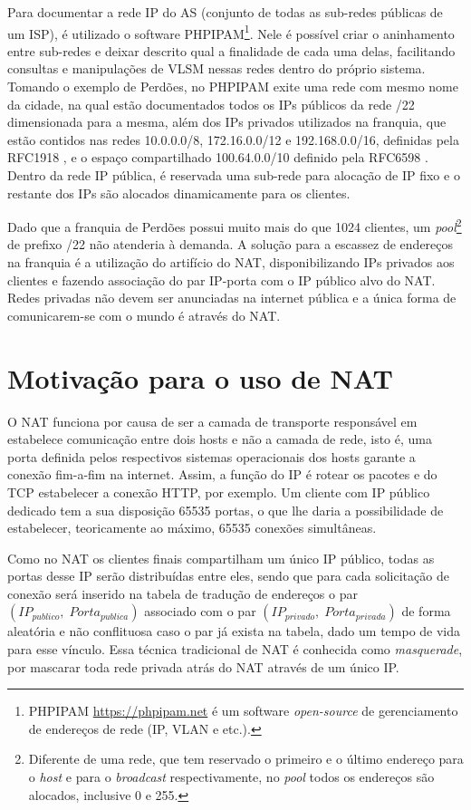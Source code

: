    Para documentar a rede IP do AS (conjunto de todas as sub-redes públicas de um ISP), é utilizado o software PHPIPAM\footnote{PHPIPAM \url{https://phpipam.net} é um software \textit{open-source} de gerenciamento de endereços de rede (IP, VLAN e etc.).}. Nele é possível criar o aninhamento entre sub-redes e deixar descrito qual a finalidade de cada uma delas, facilitando consultas e manipulações de VLSM nessas redes dentro do próprio sistema. Tomando o exemplo de Perdões, no PHPIPAM exite uma rede com mesmo nome da cidade, na qual estão documentados todos os IPs públicos da rede /22 dimensionada para a mesma, além dos IPs privados utilizados na franquia, que estão contidos nas redes 10.0.0.0/8, 172.16.0.0/12 e 192.168.0.0/16, definidas pela RFC1918 \cite{rfc1918}, e o espaço compartilhado 100.64.0.0/10 definido pela RFC6598 \cite{rfc6598}. Dentro da rede IP pública, é reservada uma sub-rede para alocação de IP fixo e o restante dos IPs são alocados dinamicamente para os clientes.
   
   Dado que a franquia de Perdões possui muito mais do que 1024 clientes, um \textit{pool}\footnote{Diferente de uma rede, que tem reservado o primeiro e o último endereço para o \textit{host} e para o \textit{broadcast} respectivamente, no \textit{pool} todos os endereços são alocados, inclusive 0 e 255.} de prefixo /22 não atenderia à demanda. A solução para a escassez de endereços na franquia é a utilização do artifício do NAT, disponibilizando IPs privados aos clientes e fazendo associação do par IP-porta com o IP público alvo do NAT. Redes privadas não devem ser anunciadas na internet pública e a única forma de comunicarem-se com o mundo é através do NAT. 
   
\section{Motivação para o uso de NAT}
   
   O NAT funciona por causa de ser a camada de transporte responsável em estabelece comunicação entre dois hosts e não a camada de rede, isto é, uma porta definida pelos respectivos sistemas operacionais dos hosts garante a conexão fim-a-fim na internet. Assim, a função do IP é rotear os pacotes e do TCP estabelecer a conexão HTTP, por exemplo. Um cliente com IP público dedicado tem a sua disposição 65535 portas, o que lhe daria a possibilidade de estabelecer, teoricamente ao máximo, 65535 conexões simultâneas.
   
   Como no NAT os clientes finais compartilham um único IP público, todas as portas desse IP serão distribuídas entre eles, sendo que para cada solicitação de conexão será inserido na tabela de tradução de endereços o par $ ( IP_{publico}, \; Porta_{publica} ) $ associado com o par $ ( IP_{privado}, \; Porta_{privada} ) $ de forma aleatória e não conflituosa caso o par já exista na tabela, dado um tempo de vida para esse vínculo. Essa técnica tradicional de NAT é conhecida como \textit{masquerade}, por mascarar toda rede privada atrás do NAT através de um único IP.
   
